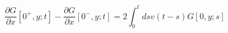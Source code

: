 \begin{equation}
\label{relation2}
\frac{\partial G}{\partial x} [0^+, y; t] - 
\frac{\partial G}{\partial x} [0^-, y; t] = 2 \int_0^t ds v(t - s) 
G[0, y; s]
\end{equation}

